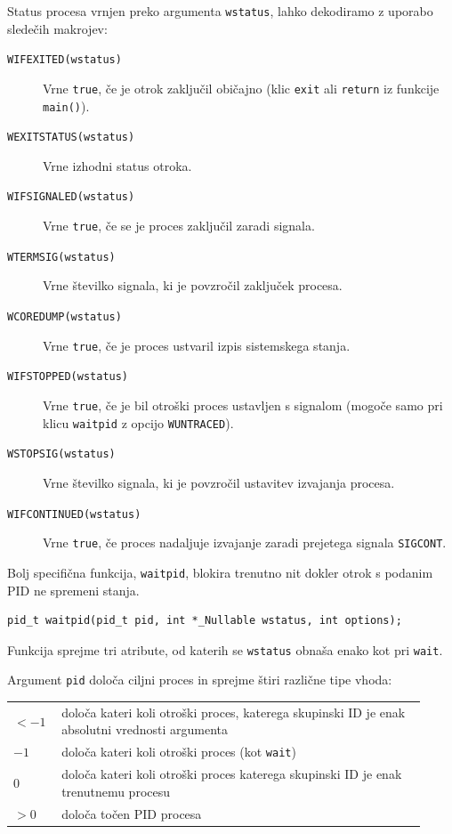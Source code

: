 \documentclass[a4paper,12pt,openright]{book}
\begin{document}
Status procesa vrnjen preko argumenta \texttt{wstatus}, lahko dekodiramo z uporabo sledečih makrojev:
\begin{description}
	\item [\texttt{WIFEXITED(wstatus)}] Vrne \texttt{true}, če je otrok zaključil običajno (klic \texttt{exit} ali \texttt{return} iz funkcije \texttt{main()}).
	\item [\texttt{WEXITSTATUS(wstatus)}] Vrne izhodni status otroka.
	\item [\texttt{WIFSIGNALED(wstatus)}] Vrne \texttt{true}, če se je proces zaključil zaradi signala.
	\item [\texttt{WTERMSIG(wstatus)}] Vrne številko signala, ki je povzročil zaključek procesa.
	\item [\texttt{WCOREDUMP(wstatus)}] Vrne \texttt{true}, če je proces ustvaril izpis sistemskega stanja.
	\item [\texttt{WIFSTOPPED(wstatus)}] Vrne \texttt{true}, če je bil otroški proces ustavljen s signalom (mogoče samo pri klicu \texttt{waitpid} z opcijo \texttt{WUNTRACED}).
	\item [\texttt{WSTOPSIG(wstatus)}] Vrne številko signala, ki je povzročil ustavitev izvajanja procesa.
	\item [\texttt{WIFCONTINUED(wstatus)}] Vrne \texttt{true}, če proces nadaljuje izvajanje zaradi prejetega signala \texttt{SIGCONT}.
\end{description}

Bolj specifična funkcija, \texttt{waitpid}, blokira trenutno nit dokler otrok s podanim PID ne spremeni stanja.

\begin{lstlisting}[style=func]
	pid_t waitpid(pid_t pid, int *_Nullable wstatus, int options);
\end{lstlisting}

Funkcija sprejme tri atribute, od katerih se \texttt{wstatus} obnaša enako kot pri \texttt{wait}.

Argument \texttt{pid} določa ciljni proces in sprejme štiri različne tipe vhoda:

\begin{tabular}{ p{0.1\linewidth} p{0.82\linewidth} }
	$< -1$ & določa kateri koli otroški proces, katerega skupinski ID je enak absolutni vrednosti argumenta \\
	$-1$   & določa kateri koli otroški proces (kot \texttt{wait})                                          \\
	$0$    & določa kateri koli otroški proces katerega skupinski ID je enak trenutnemu procesu             \\    
	$> 0$  & določa točen PID procesa                                                                       
\end{tabular}
\end{document}
